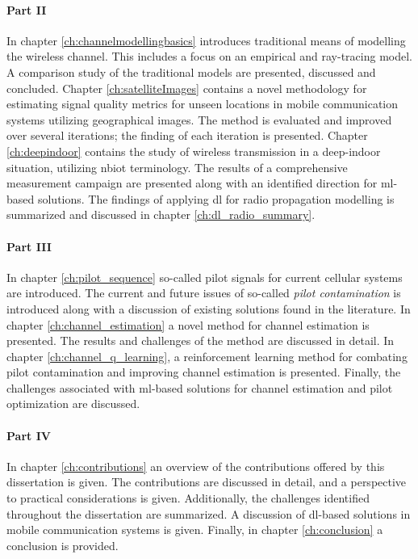 \paragraph{Part II} In chapter \ref{ch:channelmodellingbasics} introduces traditional means of modelling the wireless channel. This includes a focus on an empirical and ray-tracing model. A comparison study of the traditional models are presented, discussed and concluded. Chapter \ref{ch:satelliteImages} contains a novel methodology for estimating signal quality metrics for unseen locations in mobile communication systems utilizing geographical images. The method is evaluated and improved over several iterations; the finding of each iteration is presented. Chapter \ref{ch:deepindoor} contains the study of wireless transmission in a deep-indoor situation, utilizing \gls{nbiot} terminology. The results of a comprehensive measurement campaign are presented along with an identified direction for \gls{ml}-based solutions.  The findings of applying \gls{dl} for radio propagation modelling is summarized and discussed in chapter \ref{ch:dl_radio_summary}.

\paragraph{Part III} In chapter \ref{ch:pilot_sequence} so-called pilot signals for current cellular systems are introduced. The current and future issues of so-called \emph{pilot contamination} is introduced along with a discussion of existing solutions found in the literature. In chapter \ref{ch:channel_estimation} a novel method for channel estimation is presented. The results and challenges of the method are discussed in detail. In chapter \ref{ch:channel_q_learning}, a reinforcement learning method for combating pilot contamination and improving channel estimation is presented. Finally, the challenges associated with \gls{ml}-based solutions for channel estimation and pilot optimization are discussed. 

\paragraph{Part IV} In chapter \ref{ch:contributions} an overview of the contributions offered by this dissertation is given. The contributions are discussed in detail, and a perspective to practical considerations is given. Additionally, the challenges identified throughout the dissertation are summarized. A discussion of \gls{dl}-based solutions in mobile communication systems is given. Finally, in chapter \ref{ch:conclusion} a conclusion is provided.




